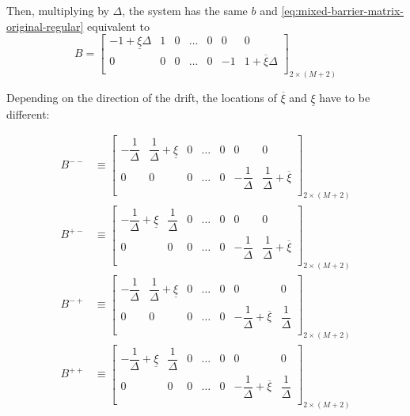 \documentclass[11pt]{article}
\theoremstyle{definition}
\begin{document}
Then, multiplying by $\Delta$, the system has the same $b$ and \cref{eq:mixed-barrier-matrix-original-regular}  equivalent to
\begin{equation}
B = \begin{bmatrix}
-1 +  \underline{\xi} \Delta & 1 & 0 & \dots & 0 & 0 & 0 \\
0 & 0 & 0 & \dots & 0 & -1 & 1 + \overline{\xi} \Delta\\
\end{bmatrix}_{2 \times (M+2)}\label{eq:B-mixed}
\end{equation}

Depending on the direction of the drift, the locations of $\overline{\xi}$ and $\underline{\xi}$ have to be different:
 
\begin{align}
B^{--} &\equiv 
\begin{bmatrix}
-\dfrac{1}{\Delta} & \dfrac{1}{\Delta}  + \underline{\xi} & 0 & \dots & 0 & 0 & 0 \\
0 & 0 & 0 & \dots & 0 & -\dfrac{1}{\Delta} & \dfrac{1}{\Delta} + \overline{\xi}\\
\end{bmatrix}_{2 \times (M+2)} \\
B^{+-} &\equiv 
\begin{bmatrix}
-\dfrac{1}{\Delta} + \underline{\xi} & \dfrac{1}{\Delta} & 0 & \dots & 0 & 0 & 0 \\
0 & 0 & 0 & \dots & 0 & -\dfrac{1}{\Delta} & \dfrac{1}{\Delta} + \overline{\xi}\\
\end{bmatrix}_{2 \times (M+2)} \\
B^{-+} &\equiv 
\begin{bmatrix}
-\dfrac{1}{\Delta}  & \dfrac{1}{\Delta} + \underline{\xi} & 0 & \dots & 0 & 0 & 0 \\
0 & 0 & 0 & \dots & 0 & -\dfrac{1}{\Delta}+ \overline{\xi} & \dfrac{1}{\Delta}\\
\end{bmatrix}_{2 \times (M+2)} \\
B^{++} &\equiv 
\begin{bmatrix}
-\dfrac{1}{\Delta} + \underline{\xi} & \dfrac{1}{\Delta} & 0 & \dots & 0 & 0 & 0 \\
0 & 0 & 0 & \dots & 0 & -\dfrac{1}{\Delta}+ \overline{\xi} & \dfrac{1}{\Delta} \\
\end{bmatrix}_{2 \times (M+2)}
\end{align}
\end{document}
